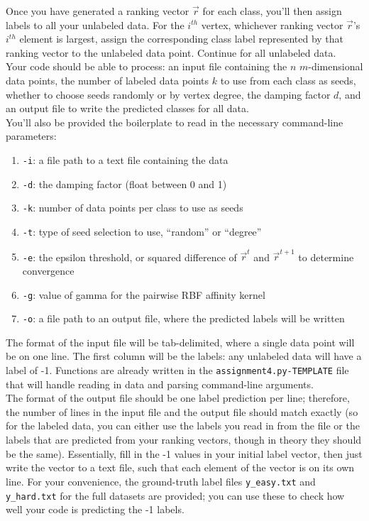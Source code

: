 \documentclass[paper=a4, fontsize=11pt]{scrartcl} %
\numberwithin{figure}{section} %
\numberwithin{table}{section} %
\begin{document}
Once you have generated a ranking vector $\vec{r}$ for each class, you'll then assign labels to all your unlabeled data. For the $i^{th}$ vertex, whichever ranking vector $\vec{r}$'s $i^{th}$ element is largest, assign the corresponding class label represented by that ranking vector to the unlabeled data point. Continue for all unlabeled data. \\

Your code should be able to process: an input file containing the $n$ $m$-dimensional data points, the number of labeled data points $k$ to use from each class as seeds, whether to choose seeds randomly or by vertex degree, the damping factor $d$, and an output file to write the predicted classes for all data. \\

You'll also be provided the boilerplate to read in the necessary command-line parameters:

\begin{enumerate}
	\item \texttt{-i}: a file path to a text file containing the data
	\item \texttt{-d}: the damping factor (float between 0 and 1)
	\item \texttt{-k}: number of data points per class to use as seeds
	\item \texttt{-t}: type of seed selection to use, ``random'' or ``degree''
	\item \texttt{-e}: the epsilon threshold, or squared difference of $\vec{r}^t$ and $\vec{r}^{t + 1}$ to determine convergence
	\item \texttt{-g}: value of gamma for the pairwise RBF affinity kernel
	\item \texttt{-o}: a file path to an output file, where the predicted labels will be written
\end{enumerate}

The format of the input file will be tab-delimited, where a single data point will be on one line. The first column will be the labels: any unlabeled data will have a label of -1. Functions are already written in the \texttt{assignment4.py-TEMPLATE} file that will handle reading in data and parsing command-line arguments. \\

The format of the output file should be one label prediction per line; therefore, the number of lines in the input file and the output file should match exactly (so for the labeled data, you can either use the labels you read in from the file or the labels that are predicted from your ranking vectors, though in theory they should be the same). Essentially, fill in the -1 values in your initial label vector, then just write the vector to a text file, such that each element of the vector is on its own line. For your convenience, the ground-truth label files \texttt{y\_easy.txt} and \texttt{y\_hard.txt} for the full datasets are provided; you can use these to check how well your code is predicting the -1 labels. \\
\end{document}
